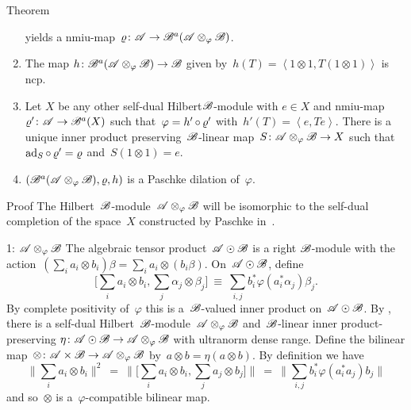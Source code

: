 \documentclass[b]{subfiles}
\begin{document}
\begin{parsec}
\begin{point}{Theorem}
\begin{enumerate}
        yields a
        nmiu-map~$\varrho\colon \mathscr{A} \to \mathscr{B}^a(\mathscr{A}\otimes_\varphi \mathscr{B})$.
\item
    The map
    $h\colon \mathscr{B}^a(\mathscr{A}\otimes_\varphi\mathscr{B}) \to \mathscr{B}$
    given by~$h(T) =\left<1 \otimes 1, T(1 \otimes 1)\right>$
    is ncp.
\item
Let $X$ be any other self-dual Hilbert$\mathscr{B}$-module with $e \in X$ and
        nmiu-map~$\varrho'\colon \mathscr{A} \to \mathscr{B}^a(X)$
        such that~$\varphi  = h' \mathop{\circ} \varrho'$
        with~$h'(T) = \left<e,T e\right>$.
There is a unique
        inner product preserving~$\mathscr{B}$-linear
        map~$S \colon \mathscr{A}\otimes_\varphi\mathscr{B} \to X$
        such that~$\mathrm{ad}_S \mathop{\circ} \varrho' = \varrho$
        and~$S( 1\otimes 1) = e$.
\item
$(\mathscr{B}^a(\mathscr{A} \otimes_\varphi \mathscr{B}), \varrho, h)$
    is a Paschke dilation of~$\varphi$.
\end{enumerate}
\begin{point}{Proof}%
The Hilbert~$\mathscr{B}$-module~$\mathscr{A} \otimes_\varphi \mathscr{B}$
    will be isomorphic to the self-dual completion of the space~$X$
    constructed by Paschke in~\cite[Thm.~5.2]{paschke}.
\begin{point}{1: $\mathscr{A} \otimes_\varphi \mathscr{B}$}%
The algebraic tensor product~$\mathscr{A} \odot \mathscr{B}$
    is a right $\mathscr{B}$-module
with the action~$(\sum_i a_i \otimes b_i)\beta = \sum_i a_i \otimes(b_i\beta)$.
On~$\mathscr{A} \odot \mathscr{B}$, define
\begin{equation*}
    \bigl[\sum_i a_i \otimes b_i, \sum_j \alpha_j \otimes \beta_j\bigr]
    \ \equiv\  \sum_{i,j} b_i^* \varphi(a_i^*\alpha_j)\beta_j.
\end{equation*}
By complete positivity of~$\varphi$
this is a~$\mathscr{B}$-valued inner product on~$\mathscr{A} \odot \mathscr{B}$.
By ,
    there is a self-dual Hilbert~$\mathscr{B}$-module~$\mathscr{A}\otimes_\varphi \mathscr{B}$
    and~$\mathscr{B}$-linear inner product-preserving
    $\eta\colon \mathscr{A} \odot \mathscr{B} \to \mathscr{A} \otimes_\varphi \mathscr{B}$
    with ultranorm dense range.
Define the bilinear map~$\otimes \colon \mathscr{A} \times \mathscr{B} \to \mathscr{A} \otimes_\varphi \mathscr{B}$
    by~$a \otimes b = \eta(a \otimes b)$.
By definition we have
\begin{equation*}
\bigl\| \sum_i a_i \otimes b_i \bigr\|^2
    \ =\  \bigl\|\bigl[ \sum_i a_i\otimes b_i, \sum_j a_j \otimes b_j \bigr]\bigr\|
    \ =\  \bigl\|\sum_{i,j} b_i^* \varphi(a_i^*a_j) b_j\bigr\|
\end{equation*}
and so~$\otimes$ is a~$\varphi$-compatible bilinear map.


\end{point}
\end{point}
\end{point}
\end{parsec}
\end{document}
